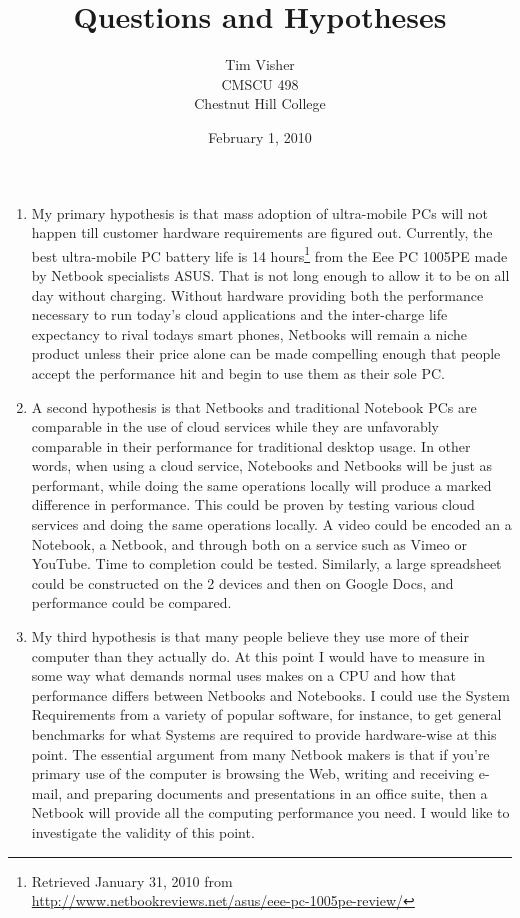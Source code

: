 \documentclass[12pt,oneside,letterpaper]{article}
\author{Tim Visher\\ CMSCU 498\\ Chestnut Hill College}
\title{Questions and Hypotheses}
\date{February 1, 2010}
\begin{document}
\maketitle

\begin{enumerate}

\item My primary hypothesis is that mass adoption of ultra-mobile PCs will not
  happen till customer hardware requirements are figured out.  Currently, the
  best ultra-mobile PC battery life is 14 hours\footnote{Retrieved January 31,
    2010 from\\ \url{http://www.netbookreviews.net/asus/eee-pc-1005pe-review/}}
  from the Eee PC 1005PE made by Netbook specialists ASUS.  That is not long
  enough to allow it to be on all day without charging.  Without hardware
  providing both the performance necessary to run today's cloud applications and
  the inter-charge life expectancy to rival todays smart phones, Netbooks will
  remain a niche product unless their price alone can be made compelling enough
  that people accept the performance hit and begin to use them as their sole PC.

\item A second hypothesis is that Netbooks and traditional Notebook PCs are
  comparable in the use of cloud services while they are unfavorably comparable
  in their performance for traditional desktop usage.  In other words, when
  using a cloud service, Notebooks and Netbooks will be just as performant,
  while doing the same operations locally will produce a marked difference in
  performance.  This could be proven by testing various cloud services and doing
  the same operations locally.  A video could be encoded an a Notebook, a
  Netbook, and through both on a service such as Vimeo or YouTube.  Time to
  completion could be tested. Similarly, a large spreadsheet could be
  constructed on the 2 devices and then on Google Docs, and performance could be
  compared.

\item My third hypothesis is that many people believe they use more of their
  computer than they actually do.  At this point I would have to measure in some
  way what demands normal uses makes on a CPU and how that performance differs
  between Netbooks and Notebooks.  I could use the System Requirements from a
  variety of popular software, for instance, to get general benchmarks for what
  Systems are required to provide hardware-wise at this point.  The essential
  argument from many Netbook makers is that if you're primary use of the
  computer is browsing the Web, writing and receiving e-mail, and preparing
  documents and presentations in an office suite, then a Netbook will provide
  all the computing performance you need.  I would like to investigate the
  validity of this point.


\end{enumerate}
\end{document}
